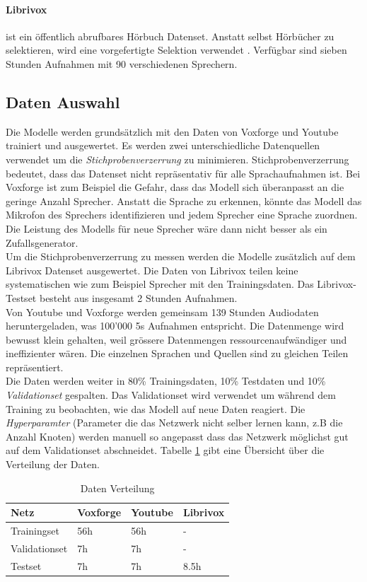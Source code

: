 \paragraph{Librivox} ist ein öffentlich abrufbares Hörbuch Datenset. Anstatt selbst Hörbücher zu selektieren, wird eine vorgefertigte Selektion verwendet \cite{librivox-compilation}. Verfügbar sind sieben Stunden Aufnahmen mit 90 verschiedenen Sprechern.


\subsection{Daten Auswahl}
Die Modelle werden grundsätzlich mit den Daten von Voxforge und Youtube trainiert und ausgewertet. Es werden zwei unterschiedliche Datenquellen verwendet um die \textit{Stichprobenverzerrung} zu minimieren. Stichprobenverzerrung bedeutet, dass das Datenset nicht repräsentativ für alle Sprachaufnahmen ist. Bei Voxforge ist zum Beispiel die Gefahr, dass das Modell sich überanpasst an die geringe Anzahl Sprecher. Anstatt die Sprache zu erkennen, könnte das Modell das Mikrofon des Sprechers identifizieren und jedem Sprecher eine Sprache zuordnen. Die Leistung des Modells für neue Sprecher wäre dann nicht besser als ein Zufallsgenerator.
\\
Um die Stichprobenverzerrung zu messen werden die Modelle zusätzlich auf dem Librivox Datenset ausgewertet. Die Daten von Librivox teilen keine systematischen  wie zum Beispiel Sprecher mit den Trainingsdaten. Das Librivox-Testset besteht aus insgesamt 2 Stunden Aufnahmen.
\\
Von Youtube und Voxforge werden gemeinsam 139 Stunden Audiodaten heruntergeladen, was 100'000 5s Aufnahmen entspricht. Die Datenmenge wird bewusst klein gehalten, weil grössere Datenmengen ressourcenaufwändiger und ineffizienter wären. Die einzelnen Sprachen und Quellen sind zu gleichen Teilen repräsentiert. 
\\
Die Daten werden weiter in 80\% Trainingsdaten, 10\% Testdaten und 10\% \textit{Validationset} gespalten. Das Validationset wird verwendet um während dem Training zu beobachten, wie das Modell auf neue Daten reagiert. Die \textit{Hyperparamter} (Parameter die das Netzwerk nicht selber lernen kann, z.B die Anzahl Knoten) werden manuell so angepasst dass das Netzwerk möglichst gut auf dem Validationset abschneidet. Tabelle \ref{tab:data} gibt eine Übersicht über die Verteilung der Daten.
\begin{table}[]
	\centering
	\begin{tabular}{llll}
	\hline
	Netz          & Voxforge & Youtube & Librivox \\ \hline
	Trainingset   & 56h      & 56h     & -        \\
	Validationset & 7h       & 7h      & -        \\
	Testset       & 7h       & 7h      & 8.5h       \\ \hline
	\end{tabular}
	\caption{Daten Verteilung}
	\label{tab:data}
\end{table}


